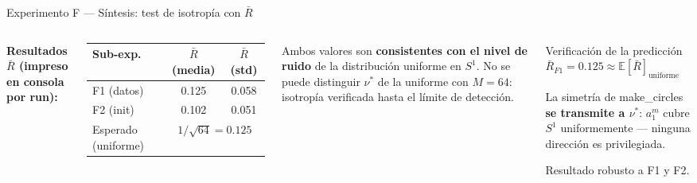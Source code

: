 \documentclass[10pt]{beamer}
\begin{document}
\begin{frame}{Experimento F — Síntesis: test de isotropía con $\bar{R}$}
\small
\begin{columns}

\textbf{Resultados $\bar{R}$ (impreso en consola por run):}

\begin{tabular}{lcc}
  \toprule
  Sub-exp. & $\bar{R}$ (media) & $\bar{R}$ (std) \\
  \midrule
  F1 (datos) & 0.125 & 0.058 \\
  F2 (init)  & 0.102 & 0.051 \\
  \midrule
  Esperado (uniforme) & \multicolumn{2}{c}{$1/\sqrt{64} = 0.125$} \\
  \bottomrule
\end{tabular}

\smallskip
Ambos valores son \textbf{consistentes con el nivel de ruido} de la distribución uniforme en $S^1$. No se puede distinguir $\nu^*$ de la uniforme con $M=64$: isotropía verificada hasta el límite de detección.

\begin{alertblock}{Verificación de la predicción}
  $\bar{R}_{F1} = 0.125 \approx \mathbb{E}[\bar{R}]_{\text{uniforme}}$

  \smallskip
  La simetría de make\_circles \textbf{se transmite a $\nu^*$}: $a_1^m$ cubre $S^1$ uniformemente — ninguna dirección es privilegiada.

  \smallskip
  Resultado robusto a F1 y F2.
\end{alertblock}
\end{columns}

\end{frame}
\end{document}
